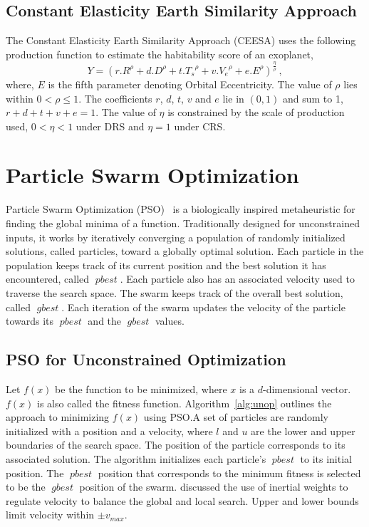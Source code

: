 \documentclass[10pt]{article}
\DeclareMathOperator*{\pbest}{\mathit{pbest}}
\DeclareMathOperator*{\gbest}{\mathit{gbest}}
\begin{document}
\subsection{Constant Elasticity Earth Similarity Approach}\label{subsec:ceesa}
The Constant Elasticity Earth Similarity Approach (CEESA) uses the following production function to estimate the
habitability score of an exoplanet,
\begin{equation}\label{eq:ceesa}
  Y = {(r.R^\rho+d.D^\rho+t.{T_s}^\rho+v.{V_e}^\rho+e.E^\rho)}^{\frac{\eta}{\rho}}\,,
\end{equation}
where, $E$ is the fifth parameter denoting Orbital Eccentricity. The value of $\rho$ lies within $0<\rho\leq 1$. The
coefficients $r$, $d$, $t$, $v$ and $e$ lie in $(0,1)$ and sum to \num{1}, $r+d+t+v+e = 1$. The value of $\eta$ is
constrained by the scale of production used, $0 < \eta < 1$ under DRS and $\eta=1$ under CRS.


\section{Particle Swarm Optimization}\label{sec:pso}

Particle Swarm Optimization (PSO)~\cite{PSO1} is a biologically inspired metaheuristic for finding the global minima of
a function. Traditionally designed for unconstrained inputs, it works by iteratively converging a population of randomly
initialized solutions, called particles, toward a globally optimal solution. Each particle in the population keeps track
of its current position and the best solution it has encountered, called $\pbest$. Each particle also has an associated
velocity used to traverse the search space. The swarm keeps track of the overall best solution, called $\gbest$. Each
iteration of the swarm updates the velocity of the particle towards its $\pbest$ and the $\gbest$ values.

\subsection{PSO for Unconstrained Optimization}\label{subsec:uopso}
Let $f(x)$ be the function to be minimized, where $x$ is a $d$-dimensional vector. $f(x)$ is also called the fitness
function. Algorithm~\ref{alg:unop} outlines the approach to minimizing $f(x)$ using PSO.\@ A set of particles are randomly
initialized with a position and a velocity, where $l$ and $u$ are the lower and upper boundaries of the search space.
The position of the particle corresponds to its associated solution. The algorithm initializes each particle's $\pbest$
to its initial position. The $\pbest$ position that corresponds to the minimum fitness is selected to be the $\gbest$
position of the swarm. \textcite{PSO2} discussed the use of inertial weights to regulate velocity to balance the global
and local search. Upper and lower bounds limit velocity within $\pm v_\mathit{max}$.
\end{document}
